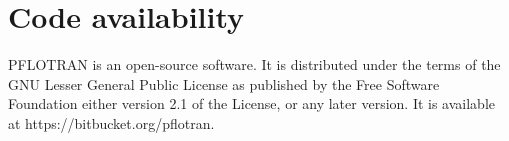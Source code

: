 \documentclass[gmd, manuscript]{copernicus}
\begin{document}




%
\section{Code availability}
PFLOTRAN is an open-source software. It is distributed under the terms of the
GNU Lesser General Public License as published by the Free Software Foundation
either version 2.1 of the License, or any later version. It is available at
https://bitbucket.org/pflotran. 
\end{document}
